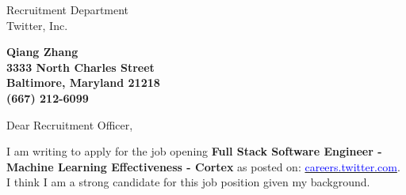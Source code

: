 \documentclass[11pt]{letter} %
\begin{document}

\begin{letter}{Recruitment Department \\
Twitter, Inc.} 


\begin{center}
\large\bf Qiang Zhang \\ %
3333 North Charles Street \\ Baltimore, Maryland 21218 \\ (667) 212-6099 %
\end{center} 
\vfill

\signature{Qiang Zhang} %


\opening{Dear Recruitment Officer,} 
 

I am writing to apply for the job opening \textbf{Full Stack Software Engineer - Machine Learning Effectiveness - Cortex} as posted on:
\href{https://careers.twitter.com/en/work-for-twitter/systems-software-engineer-cortex.html}{\textcolor{blue}{careers.twitter.com}}. I think I am a strong candidate for this job position given my background.



\end{letter}
\end{document}
